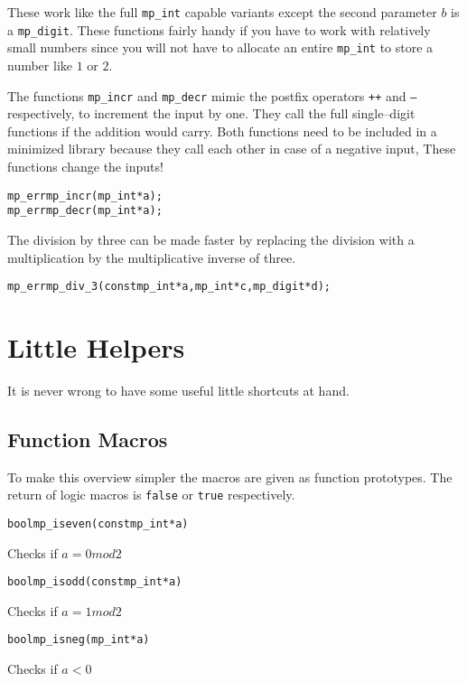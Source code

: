\documentclass[synpaper]{book}
\begin{document}
These work like the full \texttt{mp\_int} capable variants except the second parameter $b$ is a
\texttt{mp\_digit}.  These functions fairly handy if you have to work with relatively small numbers
since you will not have to allocate an entire \texttt{mp\_int} to store a number like $1$ or $2$.

The functions \texttt{mp\_incr} and \texttt{mp\_decr} mimic the postfix operators \texttt{++} and
\texttt{--} respectively, to increment the input by one. They call the full single--digit functions
if the addition would carry. Both functions need to be included in a minimized library because they
call each other in case of a negative input, These functions change the inputs!
 
\begin{alltt}
mp_err mp_incr(mp_int *a);
mp_err mp_decr(mp_int *a);
\end{alltt}

The division by three can be made faster by replacing the division with a multiplication by the
multiplicative inverse of three.

\begin{alltt}
mp_err mp_div_3(const mp_int *a, mp_int *c, mp_digit *d);
\end{alltt}

\chapter{Little Helpers}
It is never wrong to have some useful little shortcuts at hand.
\section{Function Macros}
To make this overview simpler the macros are given as function prototypes. The return of logic
macros is \texttt{false} or \texttt{true} respectively.

\begin{alltt}
bool mp_iseven(const mp_int *a)
\end{alltt}
Checks if $a = 0 mod 2$

\begin{alltt}
bool mp_isodd(const mp_int *a)
\end{alltt}
Checks if $a = 1 mod 2$

\begin{alltt}
bool mp_isneg(mp_int *a)
\end{alltt}
Checks if $a < 0$
\end{document}
